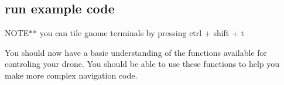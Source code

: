  \subsection*{run example code }


\begin{DoxyCode}{0}
\end{DoxyCode}
 N\+O\+T\+E$\ast$$\ast$ you can tile gnome terminals by pressing {\ttfamily ctrl + shift + t}

You should now have a basic understanding of the functions available for controling your drone. You should be able to use these functions to help you make more complex navigation code. 